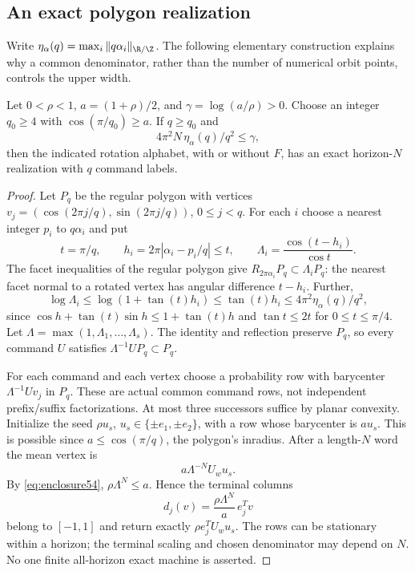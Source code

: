 \subsection{An exact polygon realization}
Write $\eta_\alpha(q)=\max_i\|q\alpha_i\|_{\R/\Z}$. The following elementary construction explains why a common denominator, rather than the number of numerical orbit points, controls the upper width.

\begin{proposition}\label{prop:polygon54}
Let $0<\rho<1$, $a=(1+\rho)/2$, and $\gamma=\log(a/\rho)>0$. Choose an integer $q_0\ge4$ with $\cos(\pi/q_0)\ge a$. If $q\ge q_0$ and
\begin{equation}\label{eq:enclosure54}
                4\pi^2N\,\eta_\alpha(q)/q^2\le\gamma,
\end{equation}
then the indicated rotation alphabet, with or without $F$, has an exact horizon-$N$ realization with $q$ command labels.
\end{proposition}
\begin{proof}
Let $P_q$ be the regular polygon with vertices $v_j=(\cos(2\pi j/q),\sin(2\pi j/q))$, $0\le j<q$. For each $i$ choose a nearest integer $p_i$ to $q\alpha_i$ and put
\[
 t=\pi/q,\qquad h_i=2\pi|\alpha_i-p_i/q|\le t,\qquad
 \Lambda_i=\frac{\cos(t-h_i)}{\cos t}.
\]
The facet inequalities of the regular polygon give $R_{2\pi\alpha_i}P_q\subset\Lambda_iP_q$: the nearest facet normal to a rotated vertex has angular difference $t-h_i$. Further,
\[
 \log\Lambda_i
 \le\log(1+\tan(t)h_i)\le\tan(t)h_i
 \le4\pi^2\eta_\alpha(q)/q^2,
\]
since $\cos h+\tan(t)\sin h\le1+\tan(t)h$ and $\tan t\le2t$ for $0\le t\le\pi/4$. Let $\Lambda=\max(1,\Lambda_1,\ldots,\Lambda_s)$. The identity and reflection preserve $P_q$, so every command $U$ satisfies $\Lambda^{-1}UP_q\subset P_q$.

For each command and each vertex choose a probability row with barycenter $\Lambda^{-1}Uv_j$ in $P_q$. These are actual common command rows, not independent prefix/suffix factorizations. At most three successors suffice by planar convexity. Initialize the seed $\rho u_s$, $u_s\in\{\pm e_1,\pm e_2\}$, with a row whose barycenter is $au_s$. This is possible since $a\le\cos(\pi/q)$, the polygon's inradius. After a length-$N$ word the mean vertex is
\[
                         a\Lambda^{-N}U_wu_s.
\]
By \eqref{eq:enclosure54}, $\rho\Lambda^N\le a$. Hence the terminal columns
\[
                       d_j(v)=\frac{\rho\Lambda^N}{a}\,e_j^Tv
\]
belong to $[-1,1]$ and return exactly $\rho e_j^TU_wu_s$. The rows can be stationary within a horizon; the terminal scaling and chosen denominator may depend on $N$. No one finite all-horizon exact machine is asserted.
\end{proof}

